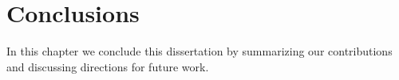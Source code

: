 \chapter{Conclusions\label{ch:conclusion}}

In this chapter we conclude this dissertation by summarizing our contributions and discussing directions for future work.

